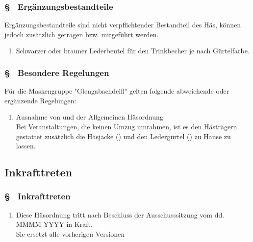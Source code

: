 \subsubsection{§ \thehoparagraphcounter\ Ergänzungsbestandteile} \label{ho:par:ergaenzungsbestandteile_glengabachdeifl}
Ergänzungsbestandteile sind nicht verpflichtender Bestandteil des Häs, können jedoch zusätzlich getragen bzw. mitgeführt werden.
\begin{enumerate}
    \item \label{ho:abs:lvqaux} Schwarzer oder brauner Lederbeutel für den Trinkbecher je nach Gürtelfarbe.
\end{enumerate}

\subsubsection{§ \thehoparagraphcounter\ Besondere Regelungen} \label{ho:par:besondere_regelungen_glengabachdeifl}
Für die Maskengruppe "Glengabachdeifl" gelten folgende abweichende oder ergänzende Regelungen:

\begin{enumerate}
    \item \label{ho:abs:2rdkge} Ausnahme von  und  der Allgemeinen Häsordnung \\
    Bei Veranstaltungen, die keinen Umzug umrahmen, ist es den Hästrägern gestattet zusätzlich die Häsjacke () und den Ledergürtel () zu Hause zu lassen.
\end{enumerate}

\subsection{Inkrafttreten}
\subsubsection{§ \thehoparagraphcounter\ Inkrafttreten} \label{ho:par:inkrafttreten}
\begin{enumerate}
    \item \label{ho:abs:t761kl} Diese Häsordnung tritt nach Beschluss der Ausschusssitzung vom dd. MMMM YYYY in Kraft. \\
    Sie ersetzt alle vorherigen Versionen
\end{enumerate}